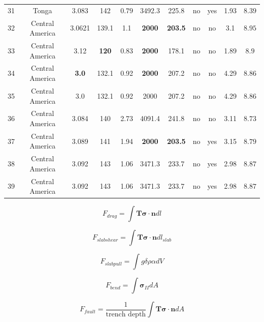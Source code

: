 \documentclass[12pt]{article}
\newcommand{\ssigma}{{\ensuremath{\boldsymbol{\sigma}}}}
\begin{document}
{\begin{table}
\begin{table}[H]
{\begin{tabular}{c c c c c c c c c c c }
           31 &Tonga  & 3.083  & 142 & $0.79 $ & 3492.3  &225.8  &no &yes &1.93  & $8.39$ \\             
            32 &Central America  & 3.0621 & 139.1 & 1.1& \textbf{2000} & \textbf{203.5} &no  &no &3.1 & $8.95$ \\               
            33 &Central America  & 3.12 & \textbf{120} & 0.83& \textbf{2000} & 178.1 &no &no &1.89 & $8.9$ \\       
            34 &Central America  & \textbf{3.0} & 132.1 & 0.92& \textbf{2000}& 207.2 &no &no &4.29 & $8.86$   \\      
            35 &Central America  & 3.0 & 132.1 & 0.92& 2000& 207.2 &no &no &4.29 & $8.86$ \\     
            36 &Central America  & 3.084 & 140 & 2.73& 4091.4 & 241.8 &no  &no &3.11 & $8.73$ \\                  
            37 &Central America  & 3.089 & 141 & 1.94& \textbf{2000} & \textbf{203.5} &no  &yes & 3.15 & $8.79$\\              
           38 &Central America  & 3.092 & 143 & 1.06& 3471.3 & 233.7 &no  &yes &2.98 &$8.87$ \\       
           39 &Central America  & 3.092 & 143 & 1.06& 3471.3 & 233.7 &no  &yes &2.98 &$8.87$ \\             
                \hline %
		\end{tabular}
        }
		\label{table:inversions} %
		\end{table}
\end{table}


\begin{equation}
F_{drag} = \int \textbf{T}\ssigma \cdot \textbf{n} dl
\end{equation}

\begin{equation}
F_{slabshear} = \int \textbf{T}\ssigma \cdot \textbf{n} dl_{slab}
\end{equation}

\begin{equation}
F_{slabpull} = \int g\delta \rho \alpha dV
\end{equation} 
 
\begin{equation}
F_{bend} = \int \ssigma_{II} dA
\end{equation} 

\begin{equation}
F_{fault} = \frac{1}{\text{trench depth}}\int \textbf{T}\ssigma\cdot\textbf{n} dA
\end{equation} 
 
}
\end{document}
